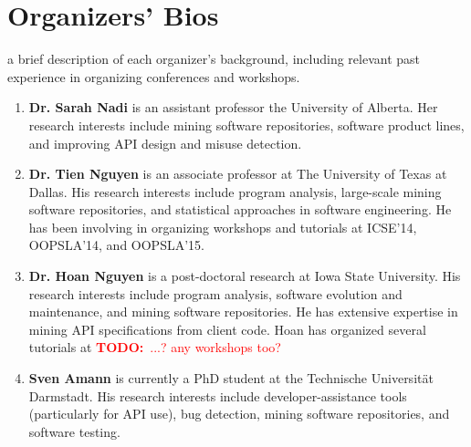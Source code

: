 \documentclass[10pt, conference]{IEEEtran}
\newcommand{\todo}[1]{{\textcolor{red}{\textbf{TODO:}~#1}}}
\begin{document}
\section{Organizers' Bios}
a brief description of each organizer's background, including relevant past experience in organizing conferences and workshops.
\begin{enumerate}
\item \textbf{Dr. Sarah Nadi} is an assistant professor the University of Alberta. Her research interests include mining software repositories, software product lines, and improving API design and misuse detection.

\item \textbf{Dr. Tien Nguyen} is an associate professor at The University of Texas at Dallas. His research interests include program analysis, large-scale mining software repositories, and statistical approaches in software engineering. He has been involving in organizing workshops and tutorials at ICSE’14, OOPSLA’14, and OOPSLA’15.

\item \textbf{Dr. Hoan Nguyen} is a post-doctoral research at Iowa State University. His research interests include program analysis, software evolution and maintenance, and mining software repositories. He has extensive expertise in mining API specifications from client code. Hoan has organized several tutorials at \todo{...? any workshops too?}

\item \textbf{Sven Amann} is currently a PhD student at the Technische Universit\"{a}t Darmstadt. His research interests include developer-assistance tools (particularly for API use), bug detection, mining software repositories, and software testing.
\end{enumerate}



\end{document}
